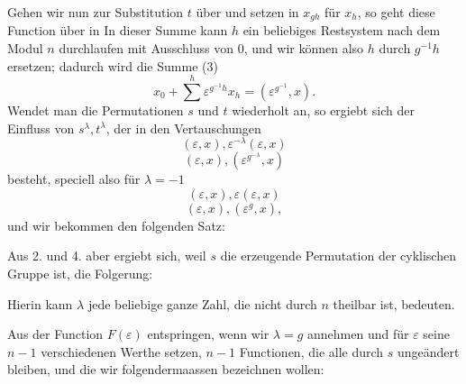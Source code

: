 Gehen wir nun zur Substitution $t$ über und setzen in
$x_{gh}$ für $x_h$, so geht diese Function über in
In dieser Summe kann $h$ ein beliebiges Restsystem nach dem Modul $n$ durchlaufen mit Ausschluss von $0$, und wir können also $h$ durch $g^{-1}h$ ersetzen; dadurch wird die Summe (3)
\[
x_0 + \sum^{h}\varepsilon^{g^{-1}h}x_h = (\varepsilon^{g^{-1}}, x).
\]
Wendet man die Permutationen $s$ und $t$ wiederholt an, so ergiebt sich der Einfluss von $s^\lambda, t^\lambda$, der in den Vertauschungen
\[
(\varepsilon, x), \varepsilon^{-\lambda}(\varepsilon, x)
\]
\[
(\varepsilon, x), (\varepsilon^{g^{-\lambda}}, x)
\]
besteht, speciell also für $\lambda = -1$
\[
(\varepsilon, x), \varepsilon(\varepsilon, x)
\]
\[
(\varepsilon, x), (\varepsilon^{g}, x),
\]
und wir bekommen den folgenden Satz:


Aus 2. und 4. aber ergiebt sich, weil $s$ die erzeugende Permutation der cyklischen Gruppe ist, die Folgerung:


Hierin kann $\lambda$ jede beliebige ganze Zahl, die nicht durch $n$ theilbar ist, bedeuten.

Aus der Function $F(\varepsilon)$ entspringen, wenn wir $\lambda = g$ annehmen und für $\varepsilon$ seine $n-1$ verschiedenen Werthe setzen, $n-1$ Functionen, die alle durch $s$ ungeändert bleiben, und die wir folgendermaassen bezeichnen wollen:
